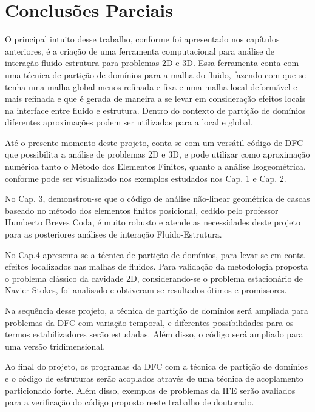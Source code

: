 \documentclass[tese_patricia]{subfiles}
\begin{document}
\chapter{Conclusões Parciais} 

O principal intuito desse trabalho, conforme foi apresentado nos capítulos anteriores, é a criação de uma ferramenta computacional para análise de interação fluido-estrutura para problemas 2D e 3D. Essa ferramenta conta com uma técnica de partição de domínios para a malha do fluido, fazendo com que se tenha uma malha global menos refinada e fixa e uma malha local deformável e mais refinada e que é gerada de maneira a se levar em consideração efeitos locais na interface entre fluido e estrutura. Dentro do contexto de partição de domínios diferentes aproximações podem ser utilizadas para a local e global.

Até o presente momento deste projeto, conta-se com um versátil código de DFC que possibilita a análise de problemas 2D e 3D, e pode utilizar como aproximação numérica tanto o Método dos Elementos Finitos, quanto a análise Isogeométrica, conforme pode ser visualizado nos exemplos estudados nos Cap. 1 e Cap. 2.

No Cap. 3, demonstrou-se que o código de análise não-linear geométrica de cascas baseado no método dos elementos finitos posicional, cedido pelo professor Humberto Breves Coda, é muito robusto e atende as necessidades deste projeto para as posteriores análises de interação Fluido-Estrutura.

No Cap.4 apresenta-se a técnica de partição de domínios, para levar-se em conta efeitos localizados nas malhas de fluidos. Para validação da metodologia proposta o problema clássico da cavidade 2D, considerando-se o problema estacionário de Navier-Stokes, foi analisado e obtiveram-se resultados ótimos e promissores.

Na sequência desse projeto, a técnica de partição de domínios será ampliada para problemas da DFC com variação temporal, e diferentes possibilidades para os termos estabilizadores serão estudadas. Além disso, o código será ampliado para uma versão tridimensional. 

Ao final do projeto, os programas da DFC com a técnica de partição de domínios e o código de estruturas serão acoplados através de uma técnica de acoplamento particionado forte. Além disso, exemplos de problemas da IFE serão avaliados para a verificação do código proposto neste trabalho de doutorado.
\end{document}
